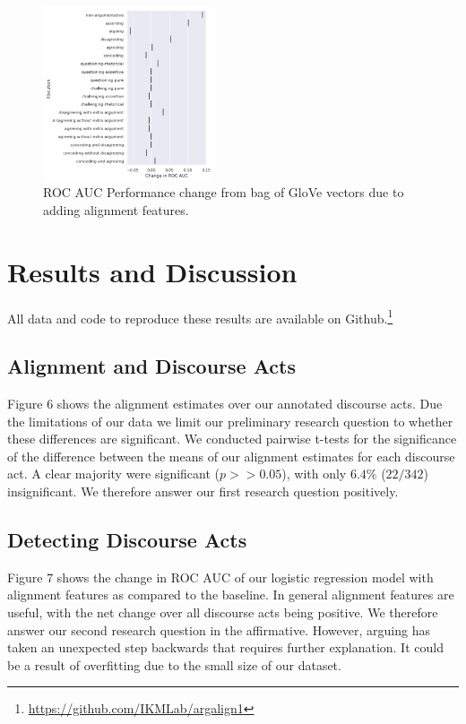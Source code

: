 \documentclass[11pt,a4paper]{article}
\begin{document}
\begin{figure}[t]
\centering
\includegraphics[width=0.45\textwidth]{diff.png}
\caption{ROC AUC Performance change from bag of GloVe vectors due to adding alignment features.}
\end{figure}

\section{Results and Discussion}

All data and code to reproduce these results are available on Github.\footnote{\hyperlink{https://github.com/IKMLab/argalign1}{https://github.com/IKMLab/argalign1}}

\subsection{Alignment and Discourse Acts}

Figure 6 shows the alignment estimates over our annotated discourse acts. Due the limitations of our data we limit our preliminary research question to whether these differences are significant. We conducted pairwise t-tests for the significance of the difference between the means of our alignment estimates for each discourse act. A clear majority were significant ($p >> 0.05$), with only $6.4\%$ ($22/342$) insignificant. We therefore answer our first research question positively.

\subsection{Detecting Discourse Acts}

Figure 7 shows the change in ROC AUC of our logistic regression model with alignment features as compared to the baseline. In general alignment features are useful, with the net change over all discourse acts being positive. We therefore answer our second research question in the affirmative. However, arguing has taken an unexpected step backwards that requires further explanation. It could be a result of overfitting due to the small size of our dataset.
\end{document}
